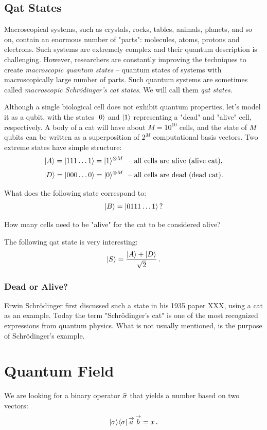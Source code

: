 \subsection{Qat States}
Macroscopical systems, such as crystals, rocks, tables, animals, planets, and so on, contain an enormous number of "parts": molecules, atoms, protons and electrons. Such systems are extremely complex and their quantum description is challenging. However, researchers are constantly improving the techniques to create \emph{macroscopic quantum states} -- quantum states of systems with macroscopically large number of parts. Such quantum systems are sometimes called \emph{macroscopic Schr\"{o}dinger's cat states}. We will call them \emph{qat states}.

Although a single biological cell does not exhibit quantum properties, let's model it as a qubit, with the states $|{0}\rangle$ and $|{1}\rangle$ representing a "dead" and "alive" cell, respectively. A
body of a cat will have about $M=10^{10}$ cells, and the state of $M$ qubits can be written as a superposition of $2^M$ computational basis vectors. Two extreme states have simple structure:
\[
|{A}\rangle=|{111\ldots 1}\rangle=|{1}\rangle^{\otimes M}\,\,\textrm{ -- all cells are alive (alive cat)},
\]
\[
|{D}\rangle=|{000\ldots 0}\rangle=|{0}\rangle^{\otimes M}\,\,\textrm{ -- all cells are dead (dead cat)}.
\]
\begin{exercise}
	What does the following state correspond to:
	\[
	|{B}\rangle = |{0111\ldots 1}\rangle\,?
	\]
	
	
	How many cells need to be "alive" for the cat to be considered alive?
\end{exercise}

The following qat state is very interesting:
\[
|{S}\rangle = \frac{|{A}\rangle+|{D}\rangle}{\sqrt{2}}\,.
\]

\subsubsection*{Dead or Alive?}
Erwin Schr\"{o}dinger first discussed such a state in his 1935 paper XXX, using a cat as an example. Today the term "Schr\"{o}dinger's cat" is one of the most recognized expressions from quantum physics. What is not usually mentioned, is the purpose of Schr\"{o}dinger's example.

\section{Quantum Field}\label{sec:QuantumField}
We are looking for a binary operator $\widehat{\sigma}$ that yields a number
based on two vectors:
\[
|{\sigma}\rangle\langle{\sigma}|\,\overset{\rightarrow}{a}\,\overset{\rightarrow}{b}=x\,.
\]

